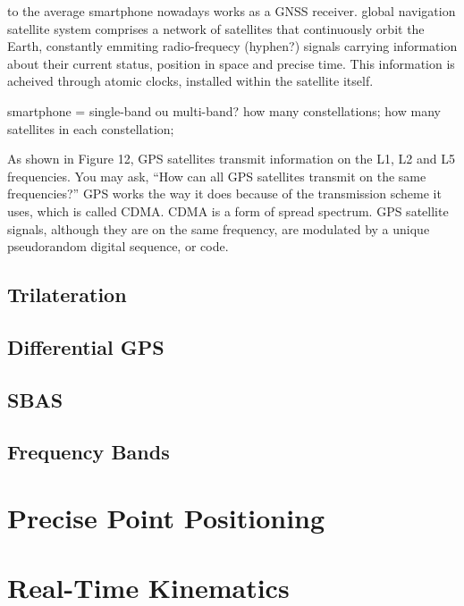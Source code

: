 to the average smartphone nowadays works as a GNSS receiver.
global navigation satellite system comprises a network of satellites that continuously orbit the Earth, constantly emmiting radio-frequecy (hyphen?) signals carrying information about their current status, position in space and precise time.
This information is acheived through atomic clocks, installed within the satellite itself.

smartphone = single-band ou multi-band?
how many constellations;
how many satellites in each constellation;

As shown in Figure 12, GPS satellites transmit information on the L1, L2 and L5 frequencies. You may ask, “How can all GPS satellites
transmit on the same frequencies?”
GPS works the way it does because of the transmission scheme it uses, which is called CDMA. CDMA is a form of spread spectrum. GPS satellite signals, although they are on the same frequency, are modulated by a unique pseudorandom digital sequence, or code.


\subsection{Trilateration}\label{sec:II_gnss_trilateration}

\subsection{Differential GPS}\label{sec:II_gnss_dgps}

\subsection{SBAS}\label{sec:II_gnss_sbas}

\subsection{Frequency Bands}\label{sec:II_gnss_freq_bands}

\section{Precise Point Positioning}\label{sec:II_ppp}

\section{Real-Time Kinematics}\label{sec:II_rtk}

